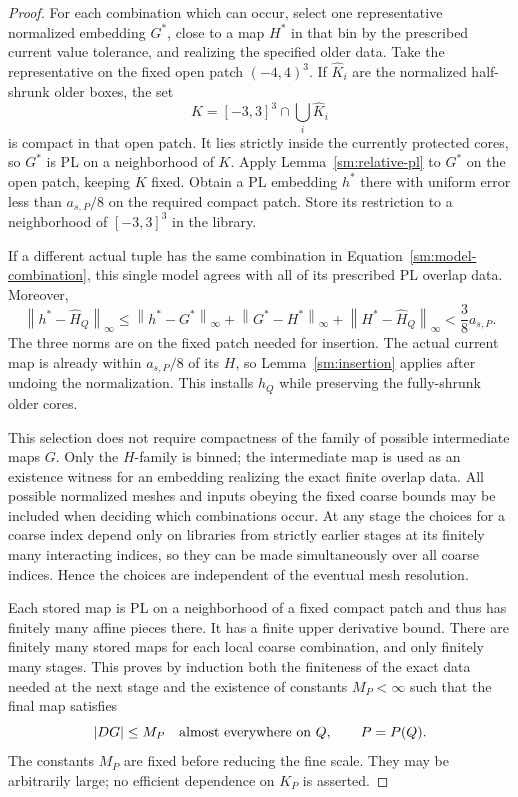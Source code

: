 \documentclass[11pt]{article}
\numberwithin{equation}{section}
\theoremstyle{definition}
\theoremstyle{remark}
\begin{document}
\begin{proof}
For each combination which can occur, select one
representative normalized embedding $G^*$, close
to a map $H^*$ in that bin by the prescribed
current value tolerance, and realizing the
specified older data.  Take the representative
on the fixed open patch $(-4,4)^3$.  If
$\widehat K_i$ are the normalized half-shrunk
older boxes, the set
\[
 K=[-3,3]^3\cap\bigcup_i\widehat K_i
\]
is compact in that open patch.  It lies
strictly inside the currently protected
cores, so $G^*$ is PL on a neighborhood of
$K$.  Apply Lemma~\ref{sm:relative-pl} to
$G^*$ on the open patch, keeping $K$ fixed.
Obtain a PL embedding $h^*$ there with
uniform error less than $a_{s,P}/8$ on the
required compact patch.  Store its restriction
to a neighborhood of $[-3,3]^3$ in the library.

If a different actual tuple has the same
combination in Equation~\eqref{sm:model-combination}, this
single model agrees with all of its prescribed
PL overlap data.  Moreover,
\begin{equation}
 \label{sm:reuse-error}
 \left\lVert h^*-\widehat H_Q\right\rVert_{\infty}
 \le \left\lVert h^*-G^*\right\rVert_{\infty}
     +\left\lVert G^*-H^*\right\rVert_{\infty}
     +\left\lVert H^*-\widehat H_Q\right\rVert_{\infty}
 <\frac38 a_{s,P}.
\end{equation}
The three norms are on the fixed patch needed
for insertion.  The actual current map is
already within $a_{s,P}/8$ of its $H$, so
Lemma~\ref{sm:insertion} applies after undoing
the normalization.  This installs $h_Q$ while
preserving the fully-shrunk older cores.

This selection does not require compactness of
the family of possible intermediate maps $G$.
Only the $H$-family is binned; the intermediate
map is used as an existence witness for an
embedding realizing the exact finite overlap
data.  All possible normalized meshes and
inputs obeying the fixed coarse bounds may
be included when deciding which combinations
occur.  At any stage the choices for a coarse
index depend only on libraries from strictly
earlier stages at its finitely many interacting
indices, so they can be made simultaneously
over all coarse indices.  Hence the choices are independent of
the eventual mesh resolution.

Each stored map is PL on a neighborhood of a
fixed compact patch and thus has finitely many
affine pieces there.  It has a finite upper
derivative bound.  There are finitely many
stored maps for each local coarse combination,
and only finitely many stages.  This proves by
induction both the finiteness of the exact data
needed at the next stage and the existence of
constants $M_P<\infty$ such that the final map
satisfies
\begin{equation}
 \label{sm:model-derivative-bound}
 |DG|\le M_P\quad\hbox{almost everywhere on }Q,
 \qquad P=P(Q).
\end{equation}
The constants $M_P$ are fixed before reducing
the fine scale.  They may be arbitrarily large;
no efficient dependence on $K_P$ is asserted.


\end{proof}
\end{document}

